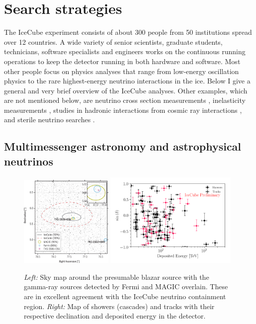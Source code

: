 \iffalse
\section{Search strategies}
The IceCube experiment consists of about 300 people from 50 institutions spread over 12 countries. A wide variety of senior scientists, graduate students, technicians, software specialists and engineers works on the continuous running operations to keep the detector running in both hardware and software. Most other people focus on physics analyses that range from low-energy oscillation physics to the rare highest-energy neutrino interactions in the ice. Below I give a general and very brief overview of the IceCube analyses. Other examples, which are not mentioned below, are neutrino cross section measurements \cite{Aartsen:2017kpd}, inelasticity measurements \cite{Aartsen:2018vez}, studies in hadronic interactions from cosmic ray interactions \cite{samDeRidder}, and sterile neutrino searches \cite{TheIceCube:2016oqi}.

\subsection{Multimessenger astronomy and astrophysical neutrinos}
\label{subsec:multimessenger}
\begin{figure}[t]
\centering
\includegraphics[width=0.4\textwidth]{chapter5/img/blazar.jpg}
\includegraphics[width=0.57\textwidth]{chapter5/img/highenergyevents.png}
\caption{\textit{Left:} Sky map around the presumable blazar source with the gamma-ray sources detected by Fermi and MAGIC overlain. These are in excellent agreement with the IceCube neutrino containment region. \textit{Right:} Map of showers (cascades) and tracks with their respective declination and deposited energy in the detector.}
\label{fig:blazarandastro}
\end{figure}

